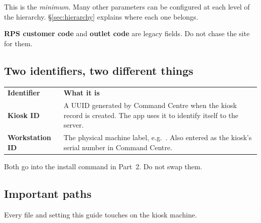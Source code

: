 \documentclass[a4paper,10pt]{article}
\begin{document}
This is the \emph{minimum}. Many other parameters can be configured at
each level of the hierarchy. \S\ref{sec:hierarchy} explains where each
one belongs.

\begin{wkwarn}
\textbf{RPS customer code} and \textbf{outlet code} are legacy fields.
Do not chase the site for them.
\end{wkwarn}

\subsection{Two identifiers, two different things}\label{sec:ids}

\begin{center}
\renewcommand{\arraystretch}{1.35}\small
\begin{tabularx}{\textwidth}{L{34mm} X}
\color{white}\textbf{Identifier} &
\color{white}\textbf{What it is}\\
\textbf{Kiosk ID} &
A UUID generated by Command Centre when the kiosk record is created. The
app uses it to identify itself to the server.\\
\textbf{Workstation ID} &
The physical machine label, e.g.\ . Also entered as the
kiosk's serial number in Command Centre.\\
\end{tabularx}
\end{center}

Both go into the install command in Part~2. Do not swap them.

\subsection{Important paths}\label{sec:paths}

Every file and setting this guide touches on the kiosk machine.
\end{document}
